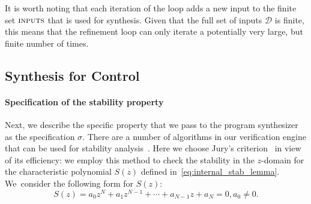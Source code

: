 \documentclass[final]{sig-alternate-05-2015}
\newcommand{\red}[1]{{\color{red}#1}}
\begin{document}

It is worth noting that each iteration of the loop adds a new input to
the finite set $\text{\sc inputs}$ that is used for synthesis.  Given
that the full set of inputs $\mathcal{D}$ is finite, this means that
the refinement loop can only iterate a potentially very large, but
finite number of times.

\subsection{Synthesis for Control}
\label{synthesis-elements}

\paragraph{Specification of the stability property}

Next, we describe the specific property that we pass to the program
synthesizer as the specification $\sigma$.  There are a number of 
algorithms in our verification engine that can be used for stability analysis~\cite{daes20161, Bessa16}.  
Here we choose Jury's criterion~\cite{astrom1997computer} in view of its efficiency: 
we employ this method to check the stability in the $z$-domain for the
characteristic polynomial $S(z)$ defined in~\eqref{eq:internal_stab_lemma}.
%
%
We~consider the following form for $S(z)$:
%
\begin{equation*}
S(z) = a_0z^N+a_1z^{N-1}+\cdots+a_{N-1}z+a_N=0, a_0\neq0. 
\end{equation*}
\end{document}

